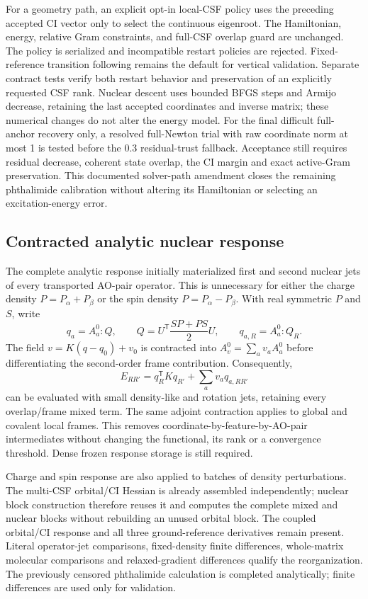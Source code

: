 For a geometry path, an explicit opt-in local-CSF policy uses the preceding accepted CI vector only to select the continuous eigenroot. The Hamiltonian, energy, relative Gram constraints, and full-CSF overlap guard are unchanged. The policy is serialized and incompatible restart policies are rejected. Fixed-reference transition following remains the default for vertical validation. Separate contract tests verify both restart behavior and preservation of an explicitly requested CSF rank. Nuclear descent uses bounded BFGS steps and Armijo decrease, retaining the last accepted coordinates and inverse matrix; these numerical changes do not alter the energy model.
For the final difficult full-anchor recovery only, a resolved full-Newton trial with raw coordinate norm at most 1 is tested before the 0.3 residual-trust fallback. Acceptance still requires residual decrease, coherent state overlap, the CI margin and exact active-Gram preservation. This documented solver-path amendment closes the remaining phthalimide calibration without altering its Hamiltonian or selecting an excitation-energy error.

\subsection{Contracted analytic nuclear response}
The complete analytic response initially materialized first and second nuclear jets of every transported AO-pair operator. This is unnecessary for either the charge density $P=P_\alpha+P_\beta$ or the spin density $P=P_\alpha-P_\beta$. With real symmetric $P$ and $S$, write
\begin{equation}
 q_a=A_a^0:Q,\qquad Q=U^{\mathsf T}\frac{SP+PS}{2}U,
 \qquad q_{a,R}=A_a^0:Q_R.
\end{equation}
The field $v=K(q-q_0)+v_0$ is contracted into $A_v^0=\sum_a v_aA_a^0$ before differentiating the second-order frame contribution. Consequently,
\begin{equation}
 E_{RR'}=q_R^{\mathsf T}Kq_{R'}+\sum_a v_aq_{a,RR'}
\end{equation}
can be evaluated with small density-like and rotation jets, retaining every overlap/frame mixed term. The same adjoint contraction applies to global and covalent local frames. This removes coordinate-by-feature-by-AO-pair intermediates without changing the functional, its rank or a convergence threshold. Dense frozen response storage is still required.

Charge and spin response are also applied to batches of density perturbations. The multi-CSF orbital/CI Hessian is already assembled independently; nuclear block construction therefore reuses it and computes the complete mixed and nuclear blocks without rebuilding an unused orbital block. The coupled orbital/CI response and all three ground-reference derivatives remain present. Literal operator-jet comparisons, fixed-density finite differences, whole-matrix molecular comparisons and relaxed-gradient differences qualify the reorganization. The previously censored phthalimide calculation is completed analytically; finite differences are used only for validation.

